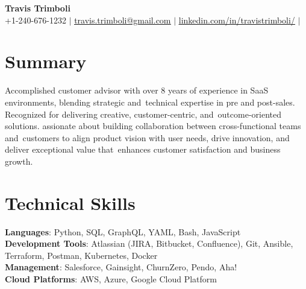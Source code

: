 \documentclass[letterpaper,11pt]{article}
\begin{document}

\begin{center}
  \textbf{\Huge \bfseries Travis Trimboli} \\ \vspace{5pt}
  \small +1-240-676-1232 $|$ \href{mailto:travis.trimboli@gmail.com}{\underline{travis.trimboli@gmail.com}} $|$
  \href{https://www.linkedin.com/in/travistrimboli/}{\underline{linkedin.com/in/travistrimboli/}} $|$
\end{center}

\section*{Summary}
Accomplished customer advisor with over 8 years of experience in SaaS environments, blending strategic and\
technical expertise in pre and post-sales. Recognized for delivering creative, customer-centric, and\
outcome-oriented solutions. assionate about building collaboration between cross-functional teams and\
customers to align product vision with user needs, drive innovation, and deliver exceptional value that\
enhances customer satisfaction and business growth.

\section{Technical Skills}
\begin{itemize}[leftmargin=0.15in, label={}]
  \small{\item{
        \textbf{Languages}{: Python, SQL, GraphQL, YAML, Bash, JavaScript} \\ \vspace{1pt}
        \textbf{Development Tools}{: Atlassian (JIRA, Bitbucket, Confluence), Git, Ansible, Terraform, Postman, Kubernetes, Docker} \\ \vspace{1pt}
        \textbf{Management}{: Salesforce, Gainsight, ChurnZero, Pendo, Aha!} \\ \vspace{1pt}
        \textbf{Cloud Platforms}{: AWS, Azure, Google Cloud Platform}
        }}
\end{itemize}
\end{document}

